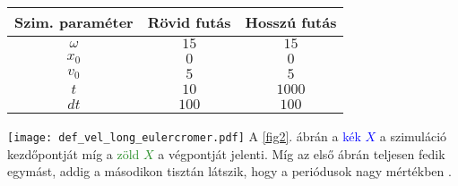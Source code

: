 \begin{multicols}{2}
\begin{center}
\begin{tabular}{c|c|c}
Szim. paraméter & Rövid futás & Hosszú futás \\
\hline \hline
$\omega$ & $15$ & $15$ \\
\hline
$x_{0}$ & $0$ & $0$ \\
\hline
$v_{0}$ & $5$ & $5$ \\
\hline
$t$ & $10$ & $1000$ \\
\hline
$dt$ & $100$ & $100$ \\
\hline
\end{tabular}
\end{center}
\label{tab3}
\hfill \break \hfill \break
{\centering\texttt{[image: def\_vel\_long\_eulercromer.pdf]}}
\label{fig2}
\hfill \break \hfill \break
A \ref{fig2}. ábrán a \textcolor{blue}{kék $X$} a szimuláció kezdőpontját míg a \textcolor{ForestGreen}{zöld $X$} a végpontját jelenti. Míg az első ábrán teljesen fedik egymást, addig a másodikon tisztán látszik, hogy a periódusok nagy mértékben .


\end{multicols}
